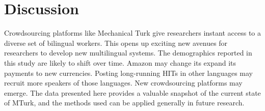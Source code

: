 \documentclass[11pt]{article}
\begin{document}
%
%
%

\section{Discussion}
Crowdsourcing platforms like Mechanical Turk give researchers instant access to a diverse set of bilingual workers.  This opens up exciting new avenues for researchers to develop new multilingual systems.   The demographics reported in this study are likely to shift over time. Amazon may change its expand its payments to new currencies.  Posting long-running HITs in other languages may recruit more speakers of those languages.  New crowdsourcing platforms may emerge. The data presented here provides a valuable snapshot of the current state of MTurk, and the methods used can be applied generally in future research. 
\end{document}
